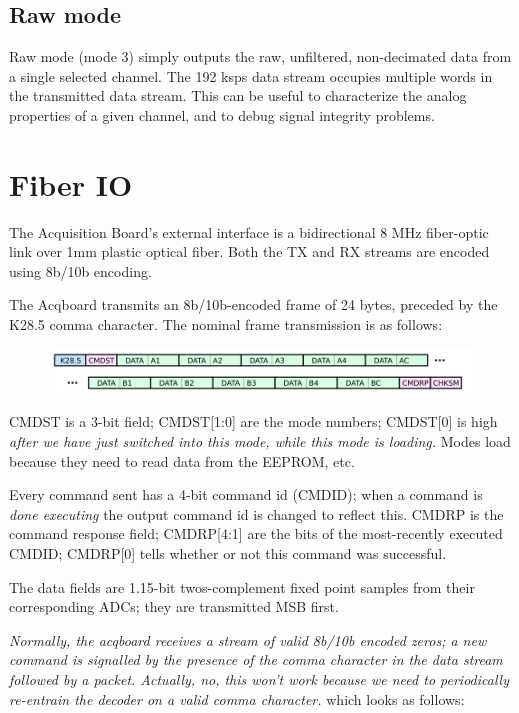 \subsection{Raw mode}
Raw mode (mode 3) simply outputs the raw, unfiltered, non-decimated
data from a single selected channel. The 192 ksps data stream occupies
multiple words in the transmitted data stream. This can be useful to
characterize the analog properties of a given channel, and to debug
signal integrity problems.


\section{Fiber IO}
The Acquisition Board's external interface is a bidirectional 8 MHz
fiber-optic link over  1mm plastic optical fiber. Both the TX
and RX streams are encoded using 8b/10b encoding.

The Acqboard transmits an 8b/10b-encoded frame of 24 bytes, preceded
by the K28.5 comma character. The nominal frame transmission is as
follows:

\begin{figure}[h!]
\includegraphics[scale=1.0]{txpacket.svg}
\end{figure}

CMDST is a 3-bit field; CMDST[1:0] are the mode numbers; CMDST[0] is
high \textit{after we have just switched into this mode, while this
  mode is loading.} Modes load because they need to read data from the
EEPROM, etc.

Every command sent has a 4-bit command id (CMDID); when a command is
\textit{done executing} the output command id is changed to reflect
this. CMDRP is the command response field; CMDRP[4:1] are the bits of
the most-recently executed CMDID; CMDRP[0] tells whether or not this
command was successful.

The data fields are 1.15-bit twos-complement fixed point samples from
their corresponding ADCs; they are transmitted MSB first.

\emph{Normally, the acqboard receives a stream of valid 8b/10b encoded
  zeros; a new command is signalled by the presence of the comma
  character in the data stream followed by a packet. Actually, no,
  this won't work because we need to periodically re-entrain the decoder
  on a valid comma character. } which looks as follows:

